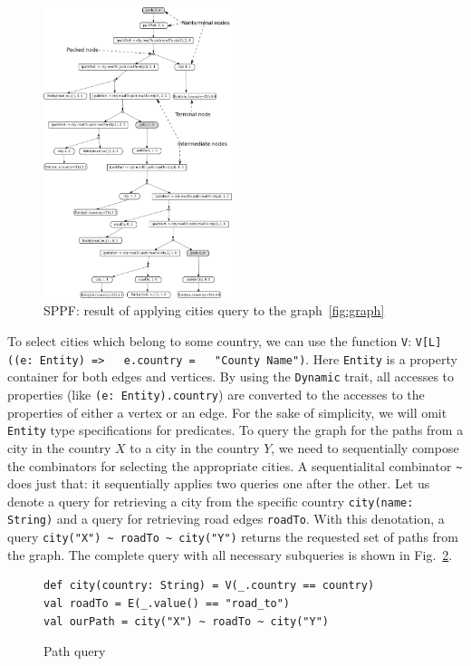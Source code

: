 \begin{figure}[h]
\includegraphics[width=0.49\textwidth]{sppf}
\caption{SPPF: result of applying cities query to the graph~\ref{fig:graph}}
\label{fig:sppf}
\end{figure}

To select cities which belong to some country, we can use the function \lstinline{V}: \lstinline{V[L]((e: Entity) =>   e.country =   "County Name")}.
Here \lstinline{Entity} is a property container for both edges and vertices.
By using the \lstinline{Dynamic} trait, all accesses to properties (like \lstinline{(e: Entity).country}) are converted to the accesses to the properties of either a vertex or an edge.
For the sake of simplicity, we will omit \lstinline{Entity} type specifications for predicates.
To query the graph for the paths from a city in the country $X$ to a city in the country $Y$, we need to sequentially compose the combinators for selecting the appropriate cities.
A sequentialital combinator \lstinline{~} does just that: it sequentially  applies two queries one after the other.
Let us denote a query for retrieving a city from the specific country \lstinline{city(name: String)} and a query for retrieving road edges \lstinline{roadTo}.
With this denotation, a query \lstinline{city("X") ~ roadTo ~ city("Y")} returns the requested set of paths from the graph.
The complete query with all necessary subqueries is shown in Fig.~\ref{fig:simpleQuery}.

\begin{figure}[h]
\begin{lstlisting}
def city(country: String) = V(_.country == country)
val roadTo = E(_.value() == "road_to")
val ourPath = city("X") ~ roadTo ~ city("Y")
\end{lstlisting}
\caption{Path query}
\label{fig:simpleQuery}
\end{figure}

